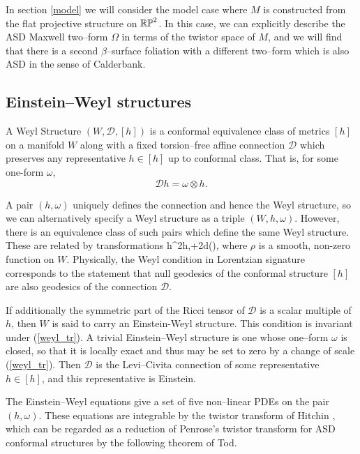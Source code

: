 In section \ref{model} we will consider the model case where $M$ is constructed from the flat projective structure on $\mathbb{RP}^2$. In this case, we can explicitly describe the ASD Maxwell two--form $\Omega$ in terms of the twistor space of $M$,
and we will find that there is a second $\beta$--surface foliation with a different two--form which is also ASD in the sense of Calderbank. 












\subsection{Einstein--Weyl structures}
\begin{defi}
A Weyl Structure $(W,\mathscr{D},[h])$ is a conformal equivalence class of metrics $[h]$ on a manifold $W$ along with a fixed torsion--free affine connection $\mathscr{D}$ which preserves any representative $h\in[h]$ up to conformal class. That is, for some one-form $\omega$,
\[
\mathscr{D}h=\omega\otimes h.
\]
\end{defi}
A pair $(h,\omega)$ uniquely defines the connection and hence the Weyl structure, so we can alternatively specify a Weyl structure as a triple $(W,h,\omega)$. However, there is an equivalence class of such pairs which define the same Weyl structure. These are related by transformations
\be
\label{weyl_tr}
h\rightarrow \rho^2h,\quad\omega\rightarrow\omega+2d(\rho),
\ee
where $\rho$ is a smooth, non-zero function on $W$. 
Physically, the Weyl condition in Lorentzian signature corresponds to the statement that null geodesics of the conformal structure $[h]$ are also geodesics of the connection $\mathscr{D}$.

If additionally the symmetric part of the Ricci tensor of $\mathscr{D}$ is a scalar multiple of $h$, then $W$ is said to carry an Einstein-Weyl structure.
This condition is invariant under (\ref{weyl_tr}). A trivial Einstein--Weyl structure is one whose one--form $\omega$ is closed, so that it is locally exact and thus may be set to zero by a change of scale (\ref{weyl_tr}). Then $\mathscr{D}$ is the Levi--Civita connection of some representative $h\in[h]$, and this representative is Einstein.

The Einstein--Weyl equations
give a set of five non--linear PDEs on the pair $(h, \omega)$. These equations
are integrable by the twistor transform of Hitchin \cite{hitchin}, which 
 can be regarded as a reduction of Penrose's twistor transform \cite{penrose} for ASD conformal structures by the following theorem of Tod.
 

